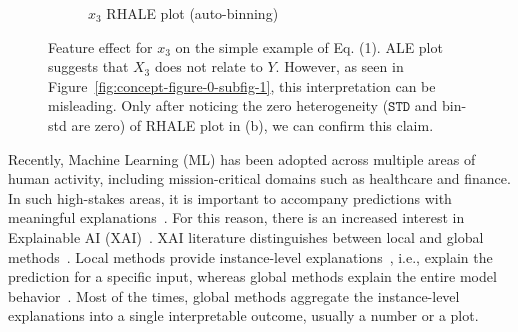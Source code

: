 \documentclass{ecai}  %
\begin{document}
\begin{figure}
\begin{subfigure}{.23\textwidth}
  \caption{\(x_3\) RHALE plot (auto-binning)}
  \label{fig:concept-figure-1-subfig-1}
\end{subfigure}
\caption{Feature effect for \(x_3\) on the simple example of Eq. (1). ALE plot suggests that \(X_3\) does not relate to \(Y\). However, as seen in Figure~\ref{fig:concept-figure-0-subfig-1}, this interpretation can be misleading. Only after noticing the zero heterogeneity (\(\mathtt{STD}\) and bin-std are zero) of RHALE plot in (b), we can confirm this claim.}
  \label{fig:ale-with-heter}
\end{figure}

Recently, Machine Learning (ML) has been adopted across multiple areas
of human activity, including mission-critical domains such as
healthcare and finance. In such high-stakes areas, it is important to
accompany predictions with meaningful explanations~\cite{wiens2019no,
  freiesleben2022scientific}.  For this reason, there is an increased
interest in Explainable AI (XAI)~\cite{ribeiro2016should,
  koh2017understanding}. XAI literature distinguishes between local
and global methods~\cite{molnar2020interpretable}. Local methods
provide instance-level explanations~\cite{casalicchio2019visualizing},
i.e., explain the prediction for a specific input, whereas global
methods explain the entire model behavior~\cite{kim2016examples}. Most
of the times, global methods aggregate the instance-level explanations
into a single interpretable outcome, usually a number or a plot.
\end{document}
